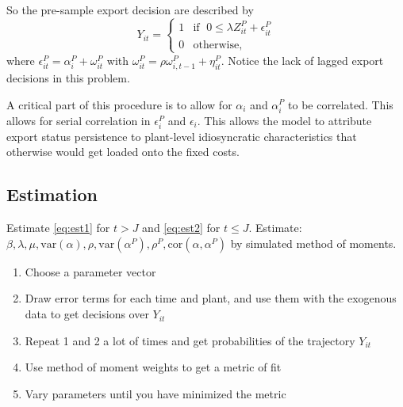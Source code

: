 \documentclass[11pt, pdftex]{article}
\newcommand{\var}{\mathrm{var}}
\newcommand{\cor}{\mathrm{cor}}
\begin{document}
\begin{enumerate}
So the pre-sample export decision are described by
\begin{equation}\label{eq:est2}
    Y_{it} = \begin{cases}
      1  &\mbox{if  }\; 0 \leq  \lambda Z_{it}^P  +\epsilon_{it}^P \\
      0 &\mbox{otherwise},
    \end{cases}
\end{equation}
where $\epsilon_{it}^P=\alpha_i^P+\omega_{it}^P$ with $\omega_{it}^P=\rho\omega^P_{i,t-1}+\eta_{it}^P$.  Notice the lack of lagged export decisions in this problem.

A critical part of this procedure is to allow for $\alpha_i$ and $\alpha_i^P$ to be correlated.  This allows for serial correlation in $\epsilon^P_{i}$ and $\epsilon_{i}$.  This allows the model to attribute export status persistence to plant-level idiosyncratic characteristics that otherwise would get loaded onto the fixed costs.
\end{enumerate}

\subsection*{Estimation}
Estimate \eqref{eq:est1} for $t>J$ and \eqref{eq:est2} for $t \leq J$.  Estimate: $\beta, \lambda, \mu, \var(\alpha), \rho, \var(\alpha^P), \rho^P, \cor(\alpha,\alpha^P)$ by simulated method of moments.

\begin{enumerate}
  \item Choose a parameter vector
  \item Draw error terms for each time and plant, and use them with the exogenous data to get decisions over $Y_{it}$
  \item Repeat 1 and 2 a lot of times and get probabilities of the trajectory $Y_{it}$
  \item Use method of moment weights to get a metric of fit
  \item Vary parameters until you have minimized the metric
\end{enumerate}
\end{document}
